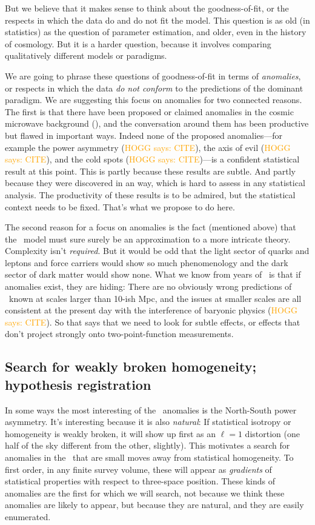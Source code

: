 \documentclass[12pt, fullpage, letterpaper]{article}
\newcommand{\HOGG}[1]{\textcolor{orange}{HOGG says: #1}}
\begin{document}
But we believe that it makes sense to think about the goodness-of-fit,
or the respects in which the data do and do not fit the model.
This question is as old (in statistics) as the question of parameter
estimation, and older, even in the history of cosmology.
But it is a harder question, because it involves comparing
qualitatively different models or paradigms.

We are going to phrase these questions of goodness-of-fit in terms of
\emph{anomalies}, or respects in which the data \emph{do not conform}
to the predictions of the dominant paradigm.
We are suggesting this focus on anomalies for two connected reasons.
The first is that there have been proposed or claimed anomalies in the
cosmic microwave background (\CMB), and the conversation around them has been
productive but flawed in important ways.
Indeed none of the proposed anomalies---for example the power
asymmetry (\HOGG{CITE}), the axis of evil (\HOGG{CITE}), and the cold
spots (\HOGG{CITE})---is a confident statistical result at this point.
This is partly because these results are subtle. And partly because
they were discovered in an  way, which is hard to
assess in any  statistical analysis.
The productivity of these results is to be admired, but the statistical
context needs to be fixed. That's what we propose to do here.

The second reason for a focus on anomalies is the fact (mentioned
above) that the \LCDM\ model must sure surely be an approximation to a
more intricate theory.
Complexity isn't \emph{required}.
But it would be odd that the light sector of quarks and leptons and
force carriers would show so much phenomenology and the dark sector of
dark matter would show none.
What we know from years of \LCDM\ is that if anomalies exist, they are
hiding: There are no obviously wrong predictions of \LCDM\ known at
scales larger than 10-ish Mpc, and the issues at smaller scales are
all consistent at the present day with the interference of baryonic
physics (\HOGG{CITE}).
So that says that we need to look for subtle effects, or effects that
don't project strongly onto two-point-function measurements.

\subsection{Search for weakly broken homogeneity; hypothesis registration}

In some ways the most interesting of the \CMB\ anomalies is the
North-South power asymmetry. It's interesting because it is also
\emph{natural}: If statistical isotropy or homogeneity is weakly
broken, it will show up first as an $\ell=1$ distortion (one half of
the sky different from the other, slightly).
This motivates a search for anomalies in the \LSS\ that are small
moves away from statistical homogeneity.
To first order, in any finite survey volume, these will appear as
\emph{gradients} of statistical properties with respect to three-space
position.
These kinds of anomalies are the first for which we will search, not
because we think these anomalies are likely to appear, but because they
are natural, and they are easily enumerated.
\end{document}
